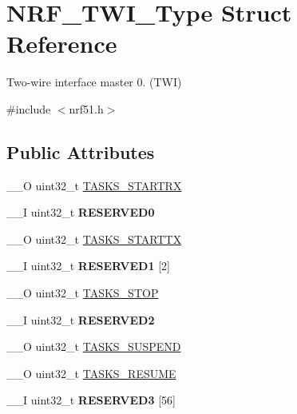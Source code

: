 \hypertarget{struct_n_r_f___t_w_i___type}{}\section{N\+R\+F\+\_\+\+T\+W\+I\+\_\+\+Type Struct Reference}
\label{struct_n_r_f___t_w_i___type}


Two-\/wire interface master 0. (T\+W\+I)  




{\ttfamily \#include $<$nrf51.\+h$>$}

\subsection*{Public Attributes}
\begin{DoxyCompactItemize}
\item 
\+\_\+\+\_\+\+O uint32\+\_\+t \hyperlink{struct_n_r_f___t_w_i___type_a2fa2431a11b2dc879cb847b824284924}{T\+A\+S\+K\+S\+\_\+\+S\+T\+A\+R\+T\+R\+X}
\item 
\hypertarget{struct_n_r_f___t_w_i___type_a45f01ee1790ed95b04a8300fed83fc05}{}\+\_\+\+\_\+\+I uint32\+\_\+t {\bfseries R\+E\+S\+E\+R\+V\+E\+D0}\label{struct_n_r_f___t_w_i___type_a45f01ee1790ed95b04a8300fed83fc05}

\item 
\+\_\+\+\_\+\+O uint32\+\_\+t \hyperlink{struct_n_r_f___t_w_i___type_a3f940c03e49fd48e1a6512cd6bd5ffb6}{T\+A\+S\+K\+S\+\_\+\+S\+T\+A\+R\+T\+T\+X}
\item 
\hypertarget{struct_n_r_f___t_w_i___type_a9e6366b284cec405dd35099fa334e2d1}{}\+\_\+\+\_\+\+I uint32\+\_\+t {\bfseries R\+E\+S\+E\+R\+V\+E\+D1} \mbox{[}2\mbox{]}\label{struct_n_r_f___t_w_i___type_a9e6366b284cec405dd35099fa334e2d1}

\item 
\+\_\+\+\_\+\+O uint32\+\_\+t \hyperlink{struct_n_r_f___t_w_i___type_a47256e642269079da3e8f12d5605f7f8}{T\+A\+S\+K\+S\+\_\+\+S\+T\+O\+P}
\item 
\hypertarget{struct_n_r_f___t_w_i___type_a336cecb58ce692ecb0a961d2e0d74212}{}\+\_\+\+\_\+\+I uint32\+\_\+t {\bfseries R\+E\+S\+E\+R\+V\+E\+D2}\label{struct_n_r_f___t_w_i___type_a336cecb58ce692ecb0a961d2e0d74212}

\item 
\+\_\+\+\_\+\+O uint32\+\_\+t \hyperlink{struct_n_r_f___t_w_i___type_aad60c79e5c883b3f61ec362e88cf6832}{T\+A\+S\+K\+S\+\_\+\+S\+U\+S\+P\+E\+N\+D}
\item 
\+\_\+\+\_\+\+O uint32\+\_\+t \hyperlink{struct_n_r_f___t_w_i___type_ae9c6a297d6a194d3f1f78f02d2620843}{T\+A\+S\+K\+S\+\_\+\+R\+E\+S\+U\+M\+E}
\item 
\hypertarget{struct_n_r_f___t_w_i___type_a07e2ededb0baa9dc8fa64cd91ac557c4}{}\+\_\+\+\_\+\+I uint32\+\_\+t {\bfseries R\+E\+S\+E\+R\+V\+E\+D3} \mbox{[}56\mbox{]}\label{struct_n_r_f___t_w_i___type_a07e2ededb0baa9dc8fa64cd91ac557c4}


\end{DoxyCompactItemize}
